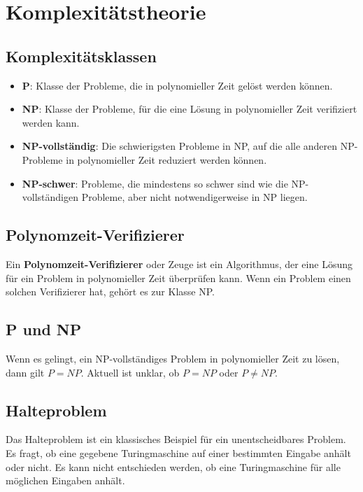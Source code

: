 \documentclass{article}
\begin{document}
\section*{Komplexitätstheorie}
\begin{minipage}[t]{0.45\textwidth}
    \subsection*{Komplexitätsklassen}
    \begin{itemize}
        \item \textbf{P}: Klasse der Probleme, die in polynomieller Zeit gelöst werden können.
        \item \textbf{NP}: Klasse der Probleme, für die eine Lösung in polynomieller Zeit verifiziert werden kann.
        \item \textbf{NP-vollständig}: Die schwierigsten Probleme in NP, auf die alle anderen NP-Probleme in polynomieller Zeit reduziert werden können.
        \item \textbf{NP-schwer}: Probleme, die mindestens so schwer sind wie die NP-vollständigen Probleme, aber nicht notwendigerweise in NP liegen.
    \end{itemize}

    \subsection*{Polynomzeit-Verifizierer}
    Ein \textbf{Polynomzeit-Verifizierer} oder Zeuge ist ein Algorithmus, der eine Lösung für ein Problem in polynomieller Zeit überprüfen kann. Wenn ein Problem einen solchen Verifizierer hat, gehört es zur Klasse NP.

    \subsection*{P und NP}
    Wenn es gelingt, ein NP-vollständiges Problem in polynomieller Zeit zu lösen, dann gilt $P = NP$. Aktuell ist unklar, ob $P = NP$ oder $P \neq NP$.

    \subsection*{Halteproblem}
    Das Halteproblem ist ein klassisches Beispiel für ein unentscheidbares Problem. Es fragt, ob eine gegebene Turingmaschine auf einer bestimmten Eingabe anhält oder nicht. Es kann nicht entschieden werden, ob eine Turingmaschine für alle möglichen Eingaben anhält.
\end{minipage}
\end{document}
